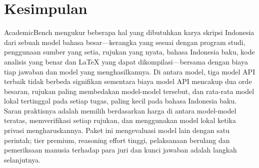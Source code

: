 \section{Kesimpulan}
\label{sec:conclusion}

AcademicBench mengukur beberapa hal yang dibutuhkan karya skripsi Indonesia dari sebuah model bahasa besar---kerangka yang sesuai dengan program studi, penggunaan sumber yang setia, rujukan yang nyata, bahasa Indonesia baku, kode analisis yang benar dan LaTeX yang dapat dikompilasi---bersama dengan biaya tiap jawaban dan model yang menghasilkannya. Di antara \NModels{} model, tiga model API terbaik tidak berbeda signifikan sementara biaya model API mencakup dua orde besaran, rujukan paling membedakan model-model tersebut, dan rata-rata model lokal tertinggal pada setiap tugas, paling kecil pada bahasa Indonesia baku. Saran praktisnya adalah memilih berdasarkan harga di antara model-model teratas, memverifikasi setiap rujukan, dan menggunakan model lokal ketika privasi mengharuskannya. Paket ini mengevaluasi model lain dengan satu perintah; tier premium, reasoning effort tinggi, pelaksanaan berulang dan pemeriksaan manusia terhadap para juri dan kunci jawaban adalah langkah selanjutnya.

